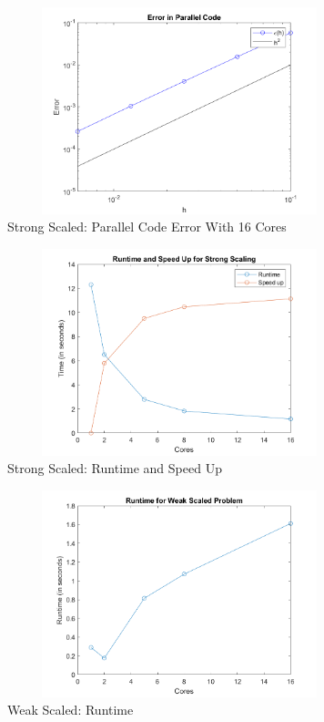 \documentclass[12pt]{article}
\begin{document}
		\vspace{1in}
		\begin{figure}[H]
			\centering
			\includegraphics[width=100mm,height=60mm]{error_parallel.png}
			\caption{Strong Scaled: Parallel Code Error With 16 Cores}
		\end{figure}
		\vspace{1in}
		\begin{figure}[H]
			\centering
			\includegraphics[width=100mm,height=60mm]{strong_time.png}
			\caption{Strong Scaled: Runtime and Speed Up}
		\end{figure}
		\vspace{1in}
			\begin{figure}[H]
			\centering
			\includegraphics[width=100mm,height=60mm]{weak_time.png}
			\caption{Weak Scaled: Runtime}
		\end{figure}
		\vspace{1in}
		
\end{document}

